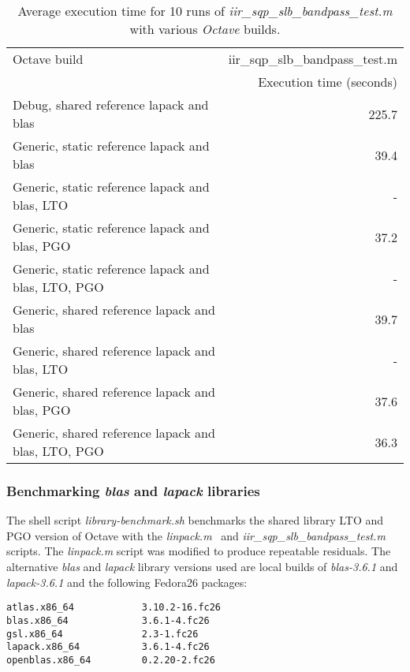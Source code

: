 \documentclass[a4paper,twoside,10pt,english]{report}
\begin{document}
\begin{table}[!htbp]
\centering
\begin{threeparttable}
\bgroup{}
\def\arraystretch{2}
\begin{tabular}{lr} \toprule
Octave build& iir\_sqp\_slb\_bandpass\_test.m \\
            & Execution time (seconds) \\
\midrule
Debug, shared reference lapack and blas              & 225.7 \\
Generic, static reference lapack and blas            &  39.4 \\
Generic, static reference lapack and blas, LTO       &     - \\
Generic, static reference lapack and blas, PGO       &  37.2 \\
Generic, static reference lapack and blas, LTO, PGO  &     - \\
Generic, shared reference lapack and blas            &  39.7 \\
Generic, shared reference lapack and blas, LTO       &     - \\
Generic, shared reference lapack and blas, PGO       &  37.6 \\
Generic, shared reference lapack and blas, LTO, PGO  &  36.3 \\
\bottomrule
\end{tabular}
\egroup{}
\end{threeparttable}
\caption[Benchmark results for Octave builds]{Average execution time 
  for 10 runs of \emph{iir\_sqp\_slb\_bandpass\_test.m} with various
  \emph{Octave} builds.}
\label{tab:benchmark-octave-builds}
\end{table}
\subsubsection*{Benchmarking \emph{blas} and \emph{lapack} libraries}
The shell script \emph{library-benchmark.sh} benchmarks the shared library 
LTO and PGO version of Octave with the
\emph{linpack.m}~\cite{Rutter_LinpackBenchmark} and
\emph{iir\_sqp\_slb\_bandpass\_test.m} scripts. The
\emph{linpack.m} script was modified to produce repeatable residuals.
The alternative \emph{blas} and \emph{lapack} library versions used are
local builds of \emph{blas-3.6.1} and \emph{lapack-3.6.1} and the following
Fedora26 packages:
\begin{small}
\begin{verbatim}
atlas.x86_64            3.10.2-16.fc26
blas.x86_64             3.6.1-4.fc26
gsl.x86_64              2.3-1.fc26
lapack.x86_64           3.6.1-4.fc26
openblas.x86_64         0.2.20-2.fc26
\end{verbatim}
\end{small}
\end{document}
